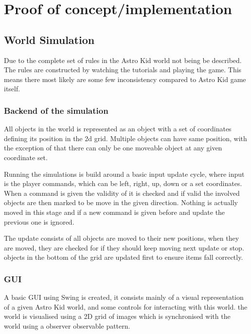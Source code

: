 \chapter{Proof of concept/implementation}

\section{World Simulation}
	Due to the complete set of rules in the Astro Kid world not being be described. The rules are constructed by watching the tutorials and playing the game. This means there most likely are some few inconsistency compared to Astro Kid game itself.


	\subsection{Backend of the simulation}
	All objects in the world is represented as an object with a set of coordinates defining its position in the 2d grid. Multiple objects can have same position, with the exception of that there can only be one moveable object at any given coordinate set.
	
	Running the simulations is build around a basic input update cycle, where input is the player commands, which can be left, right, up, down or a set coordinates. When a command is given the validity of it is checked and if valid the involved objects are then marked to be move in the given direction. Nothing is actually moved in this stage and if a new command is given before and update the previous one is ignored.
	
	The update consists of all objects are moved to their new positions, when they are moved, they are checked for if they should keep moving next update or stop. objects in the bottom of the grid are updated first to ensure items fall correctly.
	
	
	\subsection{GUI}
	A basic GUI using Swing is created, it consists mainly of a visual representation of a given Astro Kid world, and some controls for interacting with this world. the world is visualised using a 2D grid of images which is synchronised with the world using a observer observable pattern.
	
